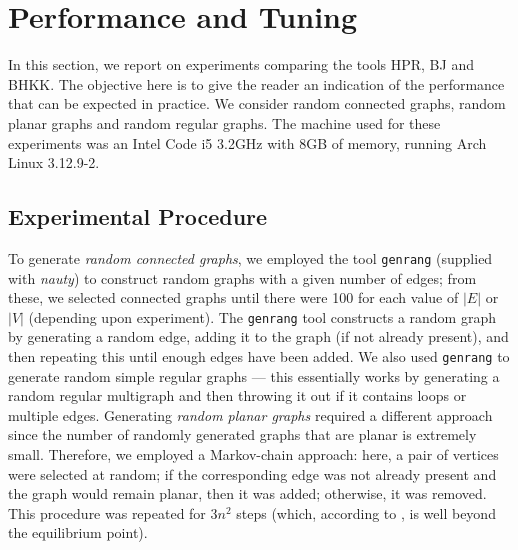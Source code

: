 
\section{Performance and Tuning}  

In this section, we report on experiments comparing the tools HPR, BJ and BHKK.  The objective here is to give the reader an indication of the performance that can be expected in practice.  We consider random connected graphs, random planar graphs and random regular graphs.  The machine used for these experiments was an Intel Code i5 3.2GHz with 8GB of memory, running Arch Linux 3.12.9-2.

\subsection{Experimental Procedure}
To generate {\em random connected graphs}, we employed the tool \verb+genrang+ (supplied with {\em nauty}) to construct random graphs with a given number of edges; from these, we selected connected graphs until there were 100 for each value of $|E|$ or $|V|$ (depending upon experiment).  The \verb+genrang+ tool constructs a random graph by generating a random edge, adding it to the graph (if not already present), and then repeating this until enough edges have been added.  We also used \verb+genrang+ to generate random simple regular graphs --- this essentially works by generating a random regular multigraph and then throwing it out if it contains loops or multiple edges.  Generating {\em random planar graphs} required a different approach since the number of randomly generated graphs that are planar is extremely small.  Therefore, we employed a Markov-chain approach:  here, a pair of vertices were selected at random; if the corresponding edge was not already present and the graph would remain planar, then it was added; otherwise, it was removed.  This procedure was repeated for $3n^2$ steps (which, according to \cite{DVW96}, is well beyond the equilibrium point).

